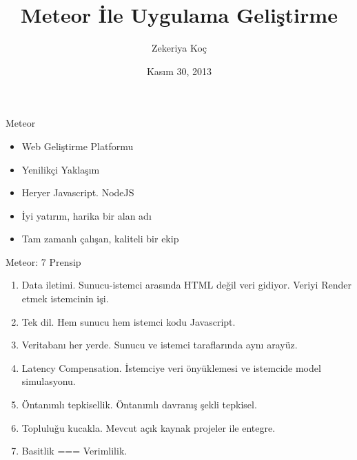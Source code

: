 \documentclass{beamer}
\title[Meteor 101]{Meteor İle Uygulama Geliştirme}
\author{Zekeriya Koç}
\institute{Metglobal}
\date{Kasım 30, 2013}
\begin{document}
    \begin{frame}
        \titlepage{}
    \end{frame}

    \begin{frame}{Meteor}
        \begin{itemize}
            \item Web Geliştirme Platformu
            \item Yenilikçi Yaklaşım
            \item Heryer Javascript. NodeJS
            \item İyi yatırım, harika bir alan adı
            \item Tam zamanlı çalışan, kaliteli bir ekip
        \end{itemize}
    \end{frame}

    \begin{frame}{Meteor: 7 Prensip}
        \begin{enumerate}
            \item Data iletimi. Sunucu-istemci arasında HTML değil veri gidiyor. Veriyi Render etmek istemcinin işi.
            \item Tek dil. Hem sunucu hem istemci kodu Javascript.
            \item Veritabanı her yerde. Sunucu ve istemci taraflarında aynı arayüz.
            \item Latency Compensation. İstemciye veri önyüklemesi ve istemcide model simulasyonu.
            \item Öntanımlı tepkisellik. Öntanımlı davranış şekli tepkisel.
            \item Topluluğu kucakla. Mevcut açık kaynak projeler ile entegre.
            \item Basitlik === Verimlilik.
        \end{enumerate}
    \end{frame}
\end{document}
